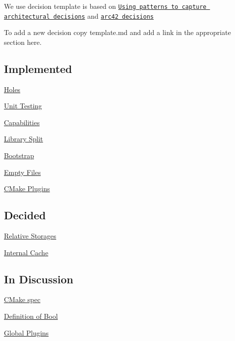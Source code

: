 We use decision template is based on \href{http://www.cs.rug.nl/~paris/papers/IEEESW07.pdf}{\tt Using patterns to capture architectural decisions} and \href{http://confluence.arc42.org/display/templateEN/9.+Design+Decisions}{\tt arc42 decisions}

To add a new decision copy template.\+md and add a link in the appropriate section here.

\subsection*{Implemented}


\begin{DoxyItemize}
\item \hyperlink{doc_decisions_holes_md}{Holes}
\item \hyperlink{doc_decisions_unit_testing_md}{Unit Testing}
\item \hyperlink{doc_decisions_capabilities_md}{Capabilities}
\item \hyperlink{doc_decisions_library_split_md}{Library Split}
\item \hyperlink{doc_decisions_bootstrap_md}{Bootstrap}
\item \hyperlink{doc_decisions_empty_files_md}{Empty Files}
\item \hyperlink{doc_decisions_cmake_plugins_md}{C\+Make Plugins}
\end{DoxyItemize}

\subsection*{Decided}


\begin{DoxyItemize}
\item \hyperlink{doc_decisions_relative_md}{Relative Storages}
\item \hyperlink{doc_decisions_internal_cache_md}{Internal Cache}
\end{DoxyItemize}

\subsection*{In Discussion}


\begin{DoxyItemize}
\item \hyperlink{doc_decisions_cmake_spec_md}{C\+Make spec}
\item \hyperlink{doc_decisions_bool_md}{Definition of Bool}
\item \hyperlink{doc_decisions_global_plugins_md}{Global Plugins}
\end{DoxyItemize}


